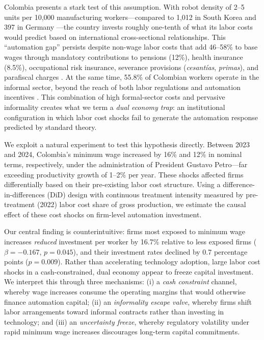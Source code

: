 \documentclass[5p,times,authoryear]{elsarticle}
\begin{document}
Colombia presents a stark test of this assumption. With robot density of 2--5 units per 10,000 manufacturing workers---compared to 1,012 in South Korea and 397 in Germany \citep{ifr2024}---the country invests roughly one-tenth of what its labor costs would predict based on international cross-sectional relationships. This ``automation gap'' persists despite non-wage labor costs that add 46--58\% to base wages through mandatory contributions to pensions (12\%), health insurance (8.5\%), occupational risk insurance, severance provisions (\textit{cesant\'{i}as}, \textit{primas}), and parafiscal charges \citep{anif2018}. At the same time, 55.8\% of Colombian workers operate in the informal sector, beyond the reach of both labor regulations and automation incentives \citep{arias2023informality}. This combination of high formal-sector costs and pervasive informality creates what we term a \emph{dual economy trap}: an institutional configuration in which labor cost shocks fail to generate the automation response predicted by standard theory.

We exploit a natural experiment to test this hypothesis directly. Between 2023 and 2024, Colombia's minimum wage increased by 16\% and 12\% in nominal terms, respectively, under the administration of President Gustavo Petro---far exceeding productivity growth of 1--2\% per year. These shocks affected firms differentially based on their pre-existing labor cost structure. Using a difference-in-differences (DiD) design with continuous treatment intensity measured by pre-treatment (2022) labor cost share of gross production, we estimate the causal effect of these cost shocks on firm-level automation investment.

Our central finding is counterintuitive: firms most exposed to minimum wage increases \emph{reduced} investment per worker by 16.7\% relative to less exposed firms ($\beta = -0.167$, $p = 0.045$), and their investment rates declined by 0.7 percentage points ($p = 0.009$). Rather than accelerating technology adoption, large labor cost shocks in a cash-constrained, dual economy appear to freeze capital investment. We interpret this through three mechanisms: (i) a \emph{cash constraint} channel, whereby wage increases consume the operating margins that would otherwise finance automation capital; (ii) an \emph{informality escape valve}, whereby firms shift labor arrangements toward informal contracts rather than investing in technology; and (iii) an \emph{uncertainty freeze}, whereby regulatory volatility under rapid minimum wage increases discourages long-term capital commitments.
\end{document}
